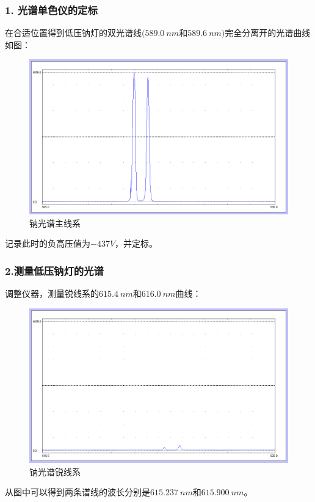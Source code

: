 \documentclass[utf8]{ctexart}
\begin{document}
	\subsubsection*{1. 光谱单色仪的定标}
	在合适位置得到低压钠灯的双光谱线$(\qty{589.0}{nm}$和$\qty{589.6}{nm})$完全分离开的光谱曲线如图：
	\begin{figure}[htbp]
		\centering
		\includegraphics[scale=0.6]{1.png}
		\caption{钠光谱主线系}
	\end{figure}

	记录此时的负高压值为$-437V$，并定标。
	\subsubsection*{2.测量低压钠灯的光谱}
	调整仪器，测量锐线系的$\qty{615.4}{nm}$和$\qty{616.0}{nm}$曲线：
	\begin{figure}[htbp]
		\centering
		\includegraphics[scale=0.6]{3rui.png}
		\caption{钠光谱锐线系}
	\end{figure}

	从图中可以得到两条谱线的波长分别是$\qty{615.237}{nm}$和$\qty{615.900}{nm}$。
	
\end{document}
